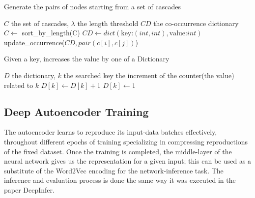 \documentclass{article}
\begin{document}
			\begin{algorithm}[H] %
				\caption{Generate the pairs of nodes starting from a set of cascades} %
				\label{alg1} %
				\begin{algorithmic} %
					\REQUIRE $C$ the set of cascades, $\lambda$ the length threshold
					\ENSURE $CD$ the co-occurrence dictionary
					\STATE $C \gets$ sort\_by\_length(C)
					\STATE $CD \gets dict(\text{key:} (int,int), \text{value:} int)$
								\STATE update\_occurrence($CD,pair(c[i],c[j])$)
							\ENDFOR
						\ENDFOR
					\ENDFOR
				\end{algorithmic}
			\end{algorithm}
			
			\begin{algorithm}[H] %
				\caption{Given a key, increases the value by one of a Dictionary} %
				\label{alg2} %
				\begin{algorithmic} %
					\REQUIRE $D$ the dictionary, $k$ the searched key
					\ENSURE the increment of the counter(the value) related to $k$
						\STATE $D[k] \gets D[k]+1$
					\ELSE
						\STATE $D[k] \gets 1$
					\ENDIF
				\end{algorithmic}
			\end{algorithm}
			
			\subsection{Deep Autoencoder Training}
			The autoencoder learns to reproduce its input-data batches effectively, throughout different epochs of training specializing in compressing reproductions of the fixed dataset. Once the training is completed, the middle-layer of the neural network gives us the representation for a given input; this can be used as a substitute of the Word2Vec encoding for the network-inference task. The inference and evaluation process is done the same way it was executed in the paper DeepInfer.
			
\end{document}
